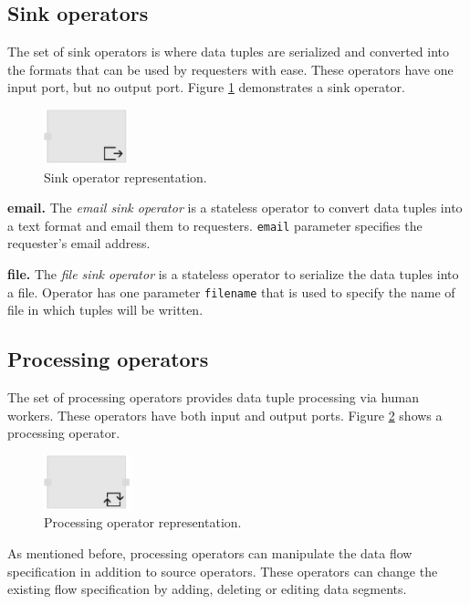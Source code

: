 \subsection{Sink operators}
The set of sink operators is where data tuples are serialized and converted into 
the formats that can be used by requesters with ease. These operators have one 
input port, but no output port. Figure \ref{fig:sink operator} demonstrates a sink operator.

\begin{figure}[ht]
	\centering
	\includegraphics[height=60px]{figures/SinkOperator.pdf}
	\caption{Sink operator representation.}
	\label{fig:sink operator}
\end{figure}

\textbf{email.}
The \textit{email sink operator} is a stateless operator to convert data tuples into a 
text format and email them to requesters. \texttt{email} parameter specifies the 
requester's email address. 

\textbf{file.}
The \textit{file sink operator} is a stateless operator to serialize the data tuples into 
a file. Operator has one parameter \texttt{filename} that is used to specify the name 
of file in which tuples will be written.

\subsection{Processing operators}
The set of processing operators provides data tuple processing via human workers. 
These operators have both input and output ports. Figure \ref{fig:processing operator} 
shows a processing operator.

\begin{figure}[ht]
	\centering
	\includegraphics[height=60px]{figures/ProcessingOperator.pdf}
	\caption{Processing operator representation.}
	\label{fig:processing operator}
\end{figure}

As mentioned before, processing operators can manipulate the data flow specification 
in addition to source operators. These operators can change the existing flow specification 
by adding, deleting or editing data segments.

